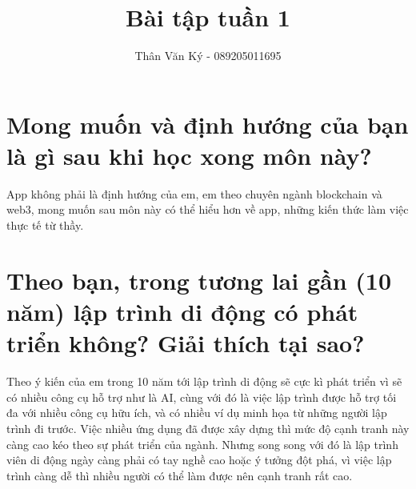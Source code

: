 \documentclass{article}
\title{Bài tập tuần 1}
\author{Thân Văn Ký - 089205011695}
\begin{document}
\maketitle

\section{Mong muốn và định hướng của bạn là gì sau khi học xong môn này?}
App không phải là định hướng của em, em theo chuyên ngành blockchain và web3, mong muốn sau môn này có thể hiểu hơn về app, những kiến thức làm việc thực tế từ thầy.

\section{Theo bạn, trong tương lai gần (10 năm) lập trình di động có phát triển không? Giải thích tại sao?}
Theo ý kiến của em trong 10 năm tới lập trình di động sẽ cực kì phát triển vì sẽ có nhiều công cụ hỗ trợ như là AI, cùng với đó là việc lập trình được hỗ trợ tối đa với nhiều công cụ hữu ích, và có nhiều ví dụ minh họa từ những người lập trình đi trước. Việc nhiều ứng dụng đã được xây dựng thì mức độ cạnh tranh này càng cao kéo theo sự phát triển của ngành. Nhưng song song với đó là lập trình viên di động ngày càng phải có tay nghề cao hoặc ý tưởng đột phá, vì việc lập trình càng dễ thì nhiều người có thể làm được nên cạnh tranh rất cao.
\end{document}
